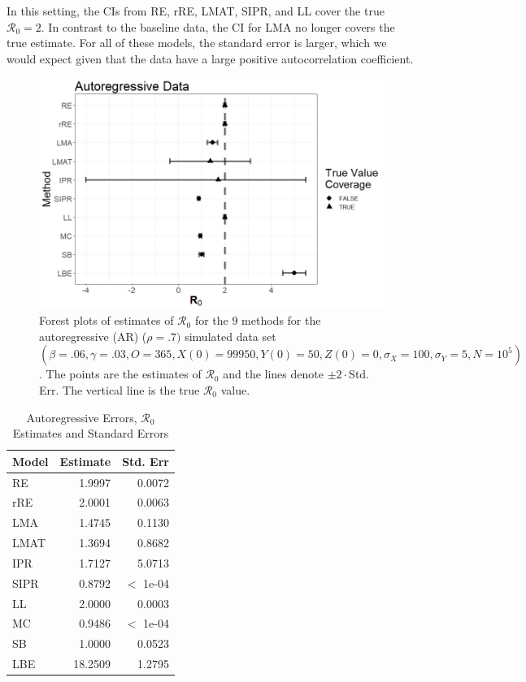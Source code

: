 \documentclass[12pt]{article}
\newcommand{\xxsir}{\ensuremath{9} } %
\newcommand{\rr}{\ensuremath{\mathcal{R}_0}}
\begin{document}
In this setting, the CIs from RE, rRE, LMAT, SIPR, and LL cover the true $\rr=2$.  In contrast to the baseline data, the CI for LMA no longer covers the true estimate.  For all of these models, the standard error is larger, which we would expect given that the data have a large positive autocorrelation coefficient.


\begin{figure}[H]
  \centering
  \includegraphics[scale=0.5]{images/AR.tiff}
  \caption{Forest plots of estimates of $\rr$ for the \xxsir methods for the autoregressive (AR) ($\rho=.7)$ simulated data set $(\beta=.06, \gamma=.03, O=365, X(0)=99950, Y(0)=50, Z(0)=0, \sigma_X=100, \sigma_Y=5, N=10^5)$.  The points are the estimates of $\rr$ and the lines denote $\pm 2\cdot $Std. Err.  The vertical line is the true $\rr$ value.}
  \end{figure}\label{fig:ar-res}
\begin{table}[H]
	
	\centering
	\begin{tabular}[t]{l|r|r}
		\hline
		Model & Estimate & Std. Err\\
		\hline
		RE & 1.9997 & 0.0072\\
		\hline
		rRE & 2.0001 & 0.0063\\
		\hline
		LMA & 1.4745 & 0.1130\\
		\hline
		LMAT & 1.3694 & 0.8682\\
		\hline
		IPR & 1.7127 & 5.0713\\
		\hline
		SIPR & 0.8792 & $<$ 1e-04 \\
		\hline
		LL & 2.0000 & 0.0003\\
		\hline
		MC & 0.9486 & $<$ 1e-04 \\
		\hline
		SB & 1.0000 & 0.0523\\
		\hline
		LBE & 18.2509 & 1.2795\\
		\hline
	\end{tabular}
        \caption{Autoregressive Errors, $\rr$ Estimates and Standard Errors}\label{tab:ar-res}
\end{table}
\end{document}
